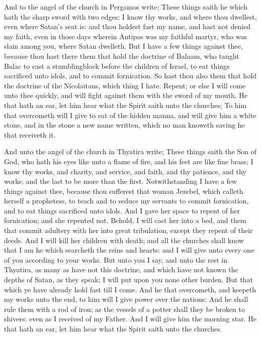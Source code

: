  And to the angel of the church in Pergamos write; These
things saith he which hath the sharp sword with two edges; 
I know thy works, and where thou dwellest, even where Satan's seat is:
and thou holdest fast my name, and hast not denied my faith, even in
those days wherein Antipas was my faithful martyr, who was slain among
you, where Satan dwelleth.  But I have a few things against
thee, because thou hast there them that hold the doctrine of Balaam, who
taught Balac to cast a stumblingblock before the children of Israel, to
eat things sacrificed unto idols, and to commit fornication.
 So hast thou also them that hold the doctrine of the
Nicolaitans, which thing I hate.  Repent; or else I will
come unto thee quickly, and will fight against them with the sword of my
mouth.  He that hath an ear, let him hear what the Spirit
saith unto the churches; To him that overcometh will I give to eat of
the hidden manna, and will give him a white stone, and in the stone a
new name written, which no man knoweth saving he that receiveth it.

 And unto the angel of the church in Thyatira write; These
things saith the Son of God, who hath his eyes like unto a flame of
fire, and his feet are like fine brass;  I know thy works,
and charity, and service, and faith, and thy patience, and thy works;
and the last to be more than the first.  Notwithstanding I
have a few things against thee, because thou sufferest that woman
Jezebel, which calleth herself a prophetess, to teach and to seduce my
servants to commit fornication, and to eat things sacrificed unto idols.
 And I gave her space to repent of her fornication; and she
repented not.  Behold, I will cast her into a bed, and them
that commit adultery with her into great tribulation, except they repent
of their deeds.  And I will kill her children with death;
and all the churches shall know that I am he which searcheth the reins
and hearts: and I will give unto every one of you according to your
works.  But unto you I say, and unto the rest in Thyatira,
as many as have not this doctrine, and which have not known the depths
of Satan, as they speak; I will put upon you none other burden.
 But that which ye have already hold fast till I come.
 And he that overcometh, and keepeth my works unto the end,
to him will I give power over the nations:  And he shall
rule them with a rod of iron; as the vessels of a potter shall they be
broken to shivers: even as I received of my Father.  And I
will give him the morning star.  He that hath an ear, let
him hear what the Spirit saith unto the churches.

